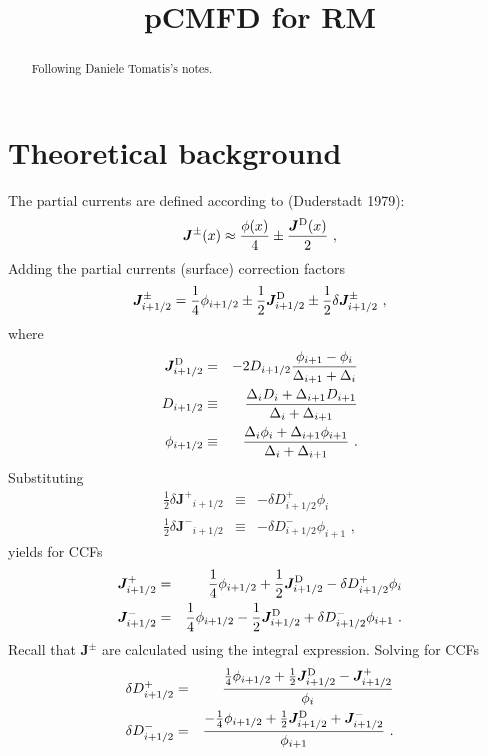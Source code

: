 \documentclass[]{article}
\title{pCMFD for RM}
\author{}
\newcommand{\jp}{\ensuremath{\bm{J}^+}}
\newcommand{\jm}{\ensuremath{\bm{J}^-}}
\newcommand{\jpm}{\ensuremath{\bm{J}^\pm}}
\newcommand{\jD}{\ensuremath{\bm{J}^{\textrm{\scriptsize{D}}}}}
\begin{document}
\maketitle

\begin{abstract}
Following Daniele Tomatis's notes. 
\end{abstract}

\section{Theoretical background}

The partial currents are defined according to (Duderstadt 1979):
\begin{equation}
\label{eq:partial-current}
\jpm (x) \approx \frac{\phi(x)}{4} \pm \frac{\jD(x)}{2} \,\, ,
\end{equation}
Adding the partial currents (surface) correction factors
\begin{equation}
\label{eq:PCCF}
\jpm _{i+1/2} = \frac{1}{4}\phi_{i+1/2}
\pm \frac{1}{2} \jD _{i+1/2} \pm \frac{1}{2} \delta \jpm _{i+1/2} \,\, ,
\end{equation}
where
\begin{eqnarray}
\label{eq:jdiff}
\jD _{i+1/2} &=& - 2 D_{i+1/2} \frac{\phi_{i+1} - \phi_i}{\Delta_{i+1}+\Delta_i} \\
D_{i+1/2} &\equiv& \frac{\Delta_i D_i + \Delta_{i+1} D_{i+1}}{\Delta_i + \Delta_{i+1}} \\
\phi_{i+1/2} &\equiv& \frac{\Delta_i \phi_i + \Delta_{i+1} \phi_{i+1}}{\Delta_i + \Delta_{i+1}} \,\, .
\end{eqnarray}
Substituting
\begin{eqnarray}
\label{eq:CCF-sub}
\frac{1}{2} \delta \jp _{i+1/2} &\equiv& -\delta D^+ _{i+1/2} \phi_i \\
\frac{1}{2} \delta \jm _{i+1/2} &\equiv& -\delta D^- _{i+1/2} \phi_{i+1}\,\, ,
\end{eqnarray}
yields for CCFs
\begin{eqnarray}
\label{eq:par4}
\jp _{i+1/2} &=& \frac{1}{4}\phi_{i+1/2}
+ \frac{1}{2}\jD _{i+1/2} - \delta D^+ _{i+1/2} \phi_i \\
\jm _{i+1/2} &=& \frac{1}{4}\phi_{i+1/2}
- \frac{1}{2}\jD _{i+1/2} + \delta D^- _{i+1/2} \phi_{i+1} \,\, .
\end{eqnarray}
Recall that $\jpm$ are calculated using the integral expression. 
%
Solving for CCFs
\begin{eqnarray}
\label{eq:ccfsss1}
\delta D^+ _{i+1/2} &=& \frac{\frac{1}{4}\phi_{i+1/2}
	+ \frac{1}{2}\jD _{i+1/2} - \jp _{i+1/2}}{\phi_i} \\
\label{eq:ccfsss2}
\delta D^- _{i+1/2} &=& \frac{-\frac{1}{4}\phi_{i+1/2}
	+ \frac{1}{2}\jD _{i+1/2} + \jm _{i+1/2}}{\phi_{i+1}} \,\, .
\end{eqnarray}
\end{document}
